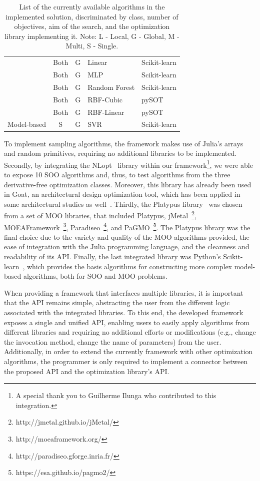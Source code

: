 \begin{table}[]
\begin{tabular}{cccll}
		& Both & G & Linear & Scikit-learn \\
		& Both & G & MLP & Scikit-learn \\
		& Both & G & Random Forest & Scikit-learn \\
		& Both & G & RBF-Cubic & pySOT \\
		& Both & G & RBF-Linear & pySOT \\
		\multirow{-10}{*}{Model-based} & S & G & SVR & Scikit-learn
	\end{tabular}
	\caption[Solution's list of supported algorithms]{List of the currently available algorithms in the implemented solution, discriminated by class, number of objectives, aim of the search, and the optimization library implementing it. Note: L - Local, G - Global, M - Multi, S - Single.}
	\label{table:algorithms}
\end{table}

To implement sampling algorithms, the framework makes use of Julia's arrays and random primitives, requiring no additional libraries to be implemented. Secondly, by integrating the NLopt~\cite{NLOPT} library within our framework\footnote{A special thank you to Guilherme Ilunga who contributed to this integration.}, we were able to expose 10 \ac{SOO} algorithms and, thus, to test algorithms from the three derivative-free optimization classes. Moreover, this library has already been used in Goat, an architectural design optimization tool, which has been applied in some architectural studies as well~\cite{Wortmann2017ADO}. Thirdly, the Platypus library~\cite{platypus} was chosen from a set of \ac{MOO} libraries, that included Platypus, jMetal~\footnote{http://jmetal.github.io/jMetal/}, MOEAFramework~\footnote{http://moeaframework.org/}, Paradiseo~\footnote{http://paradiseo.gforge.inria.fr/}, and PaGMO~\footnote{https://esa.github.io/pagmo2/}. The Platypus library was the final choice due to the variety and quality of the \ac{MOO} algorithms provided, the ease of integration with the Julia programming language, and the cleanness and readability of its \ac{API}. Finally, the last integrated library was Python's Scikit-learn~\cite{scikit-learn}, which provides the basis algorithms for constructing more complex model-based algorithms, both for \ac{SOO} and \ac{MOO} problems.

When providing a framework that interfaces multiple libraries, it is important that the \ac{API} remains simple, abstracting the user from the different logic associated with the integrated libraries. To this end, the developed framework exposes a single and unified \ac{API}, enabling users to easily apply algorithms from different libraries and requiring no additional efforts or modifications (e.g., change the invocation method, change the name of parameters) from the user. Additionally, in order to extend the currently framework with other optimization algorithms, the programmer is only required to implement a connector between the proposed \ac{API} and the optimization library's \ac{API}.

